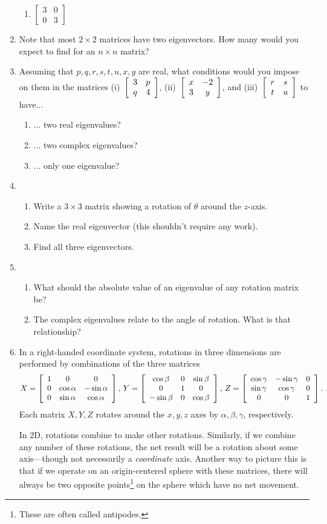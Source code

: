 \documentclass[../gatm.tex]{subfiles}
\begin{document}
\begin{enumerate}
\begin{multicols}{2}
\begin{enumerate}
\item $\left[\begin{smallmatrix} 3 & 0 \\ 0 & 3 \end{smallmatrix}\right]$
\end{enumerate}
\end{multicols}
\item Note that most $2\times 2$ matrices have two eigenvectors. How many would you expect to find for an $n\times n$ matrix?
\item Assuming that $p,q,r,s,t,u,x,y$ are real, what conditions would you impose on them in the matrices (i)~$\left[\begin{array}{cc} 3 & p \\ q & 4 \end{array}\right]$, (ii)~$\left[\begin{array}{cc} x & -2 \\ 3 & y \end{array}\right]$, and (iii)~$\left[\begin{array}{cc} r & s \\ t & u \end{array}\right]$ to have...
\begin{enumerate}
\item ... two real eigenvalues?
\item ... two complex eigenvalues?
\item ... only one eigenvalue?
\end{enumerate}
\item \begin{enumerate}
\item Write a $3\times 3$ matrix showing a rotation of $\theta$ around the $z$-axis.
\item Name the real eigenvector (this shouldn't require any work).
\item Find all three eigenvectors.
\end{enumerate}
\item \begin{enumerate}
\item What should the absolute value of an eigenvalue of any rotation matrix be?
\item The complex eigenvalues relate to the angle of rotation. What is that relationship?
\end{enumerate}
\item In a right-handed coordinate system, rotations in three dimensions are performed by combinations of the three matrices
$$X=\left[\begin{array}{ccc} 1 & 0 & 0 \\ 0 & \cos\alpha & -\sin\alpha \\ 0 & \sin\alpha & \cos\alpha \end{array}\right],\, Y=\left[\begin{array}{ccc} \cos\beta & 0 & \sin\beta \\ 0 & 1 & 0 \\ -\sin\beta & 0 & \cos\beta \end{array}\right],\, Z=\left[\begin{array}{ccc} \cos\gamma & -\sin\gamma & 0 \\ \sin\gamma & \cos\gamma & 0 \\ 0 & 0 & 1 \end{array}\right].$$
Each matrix $X,Y,Z$ rotates around the $x,y,z$ axes by $\alpha,\beta,\gamma$, respectively.

In 2D, rotations combine to make other rotations. Similarly, if we combine any number of these rotations, the net result will be a rotation about some axis---though not necessarily a \textit{coordinate} axis. Another way to picture this is that if we operate on an origin-centered sphere with these matrices, there will always be two opposite points\footnote{These are often called antipodes.} on the sphere which have no net movement.


\end{enumerate}
\end{document}
